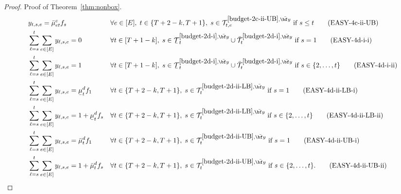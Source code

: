 \documentclass[nonblindrev,mnsc]{informs3} %
\newcommand{\by}{{\bf y}}
\newcommand{\ubar}[1]{\text{\b{$#1$}}}
\begin{document}
\begin{APPENDICES}
\begin{proof}{Proof of Theorem~\ref{thm:nonbox}.}
\begin{align}
&y_{t,s,e} =\bar{\mu}^c_{et}f_s && \forall e \in[E], \; t \in\{T+2-k,T+1\}, \; s \in   {\mathcal{T}}^{\ref{budget-2c-ii-UB},\bar{\by}}_{t,e} \text{ if } s \le t \tag{EASY-4c-ii-UB} \label{line:budget_easy_5c_ii_UB}\\
& \sum_{\ell=s}^t \sum_{e \in [E]} y_{\ell,s,e}    = 0 && \forall t \in [T+1-k], \; s \in \ubar{\mathcal{T}}^{\ref{budget-2d-i},\bar{\by}}_t \cup \bar{\mathcal{T}}^{\ref{budget-2d-i},\bar{\by}}_t \text{ if } s =1\tag{EASY-4d-i-i} \label{line:budget_easy_5d_i_i}\\
& \sum_{\ell=s}^t \sum_{e \in [E]} y_{\ell,s,e}    = 1 && \forall t \in [T+1-k], \; s \in \ubar{\mathcal{T}}^{\ref{budget-2d-i},\bar{\by}}_t \cup \bar{\mathcal{T}}^{\ref{budget-2d-i},\bar{\by}}_t \text{ if } s \in \{2,\ldots,t\} \tag{EASY-4d-i-ii} \label{line:budget_easy_5d_i_ii}\\
& \sum_{\ell=s}^t \sum_{e \in [E]} y_{\ell,s,e}    = \ubar{\mu}_t^d f_1 && \forall t \in \{T+2-k,T+1\}, \; s \in {\mathcal{T}}^{\ref{budget-2d-ii-LB},\bar{\by}}_t  \text{ if } s =1\tag{EASY-4d-ii-LB-i} \label{line:budget_easy_5d_ii_LB_i}\\
& \sum_{\ell=s}^t \sum_{e \in [E]} y_{\ell,s,e}    = 1 +\ubar{\mu}_t^d f_s && \forall t \in \{T+2-k,T+1\}, \; s \in {\mathcal{T}}^{\ref{budget-2d-ii-LB},\bar{\by}}_t  \text{ if } s \in \{2,\ldots,t\} \tag{EASY-4d-ii-LB-ii} \label{line:budget_easy_5d_ii_LB_ii}\\
& \sum_{\ell=s}^t \sum_{e \in [E]} y_{\ell,s,e}    = \bar{\mu}_t^d f_1 && \forall t \in \{T+2-k,T+1\}, \; s \in {\mathcal{T}}^{\ref{budget-2d-ii-UB},\bar{\by}}_t  \text{ if } s =1\tag{EASY-4d-ii-UB-i} \label{line:budget_easy_5d_ii_UB_i}\\
& \sum_{\ell=s}^t \sum_{e \in [E]} y_{\ell,s,e}    = 1+\bar{\mu}_t^d f_s && \forall t \in \{T+2-k,T+1\}, \; s \in {\mathcal{T}}^{\ref{budget-2d-ii-UB},\bar{\by}}_t \text{ if } s \in \{2,\ldots,t\}. \tag{EASY-4d-ii-UB-ii} \label{line:budget_easy_5d_ii_UB_ii}
 \end{align}


\end{proof}
\end{APPENDICES}
\end{document}
